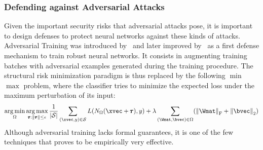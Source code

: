 \subsubsection{Defending against Adversarial Attacks}
\label{subsubsection:ch2-defending_against_adversarial_attacks}

Given the important security risks that adversarial attacks pose, it is important to design defenses to protect neural networks against these kinds of attacks.
Adversarial Training was introduced by~\citet{goodfellow2014explaining} and later improved by~\citet{madry2018towards} as a first defense mechanism to train robust neural networks.
It consists in augmenting training batches with adversarial examples generated during the training procedure.
The structural risk minimization paradigm is thus replaced by the following $\min$ $\max$ problem, where the classifier tries to minimize the expected loss under the maximum perturbation of its input:
\begin{equation}
  \argmin_\weights \argmax_{\adv: \norm{\adv} \leq \epsilon} \frac{1}{|\mathcal{S}|} \sum_{(\xvec, y) \in \mathcal{S}} L\left( \nn_\weights \left(\xvec + \adv \right), y \right) + \lambda \sum_{(\Wmat, \bvec) \in \weights} \left( \norm{\Wmat}_\mathrm{F} + \norm{\bvec}_\mathrm{2} \right)
\end{equation}
Although adversarial training lacks formal guarantees, it is one of the few techniques that proves to be empirically very effective.






%
%
%



